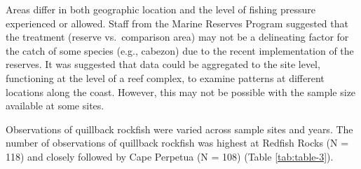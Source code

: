 \documentclass[11pt,
  english,
  a4paper,
]{article}
\begin{document}

Areas differ in both geographic location and the level of fishing pressure experienced or allowed. Staff from the Marine Reserves Program suggested that the treatment (reserve vs.~comparison area) may not be a delineating factor for the catch of some species (e.g., cabezon) due to the recent implementation of the reserves. It was suggested that data could be aggregated to the site level, functioning at the level of a reef complex, to examine patterns at different locations along the coast. However, this may not be possible with the sample size available at some sites.

\leavevmode\tagmcend\tagstructend\par


Observations of quillback rockfish were varied across sample sites and years. The number of observations of quillback rockfish was highest at Redfish Rocks (N = 118) and closely followed by Cape Perpetua (N = 108) (Table \ref{tab:table-3}).

\leavevmode\tagmcend\tagstructend\par

\begingroup\fontsize{10}{12}\selectfont
\begingroup\fontsize{10}{12}\selectfont
\end{document}
